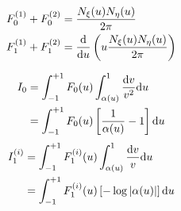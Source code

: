 \begin{align}
	F_0^{(1)} + F_0^{(2)} &= \frac{N_{\xi}(u) N_{\eta}(u)}{2\pi} \\
	F_1^{(1)} + F_1^{(2)} &= \frac{\mathrm{d}}{\mathrm{d} u} \left( u \frac{N_{\xi}(u) N_{\eta}(u)}{2\pi}\right)
\end{align}

%
\begin{align}
	I_0 &= \int_{-1}^{+1} F_0(u) \int_{\alpha(u)}^{1} \frac{\mathrm{d} v}{v^2} \mathrm{d} u \\
	&= \int_{-1}^{+1} F_0(u) \left[  \frac{1}{\alpha(u)} - 1  \right] \mathrm{d} u
\end{align}
%
\begin{align}
	I^{(i)}_1 &= \int_{-1}^{+1} F^{(i)}_1(u) \int_{\alpha(u)}^{1} \frac{\mathrm{d} v}{v} \mathrm{d} u \\
	&= \int_{-1}^{+1} F^{(i)}_1(u) \left[ -\log|\alpha(u)| \right] \mathrm{d} u
\end{align}
